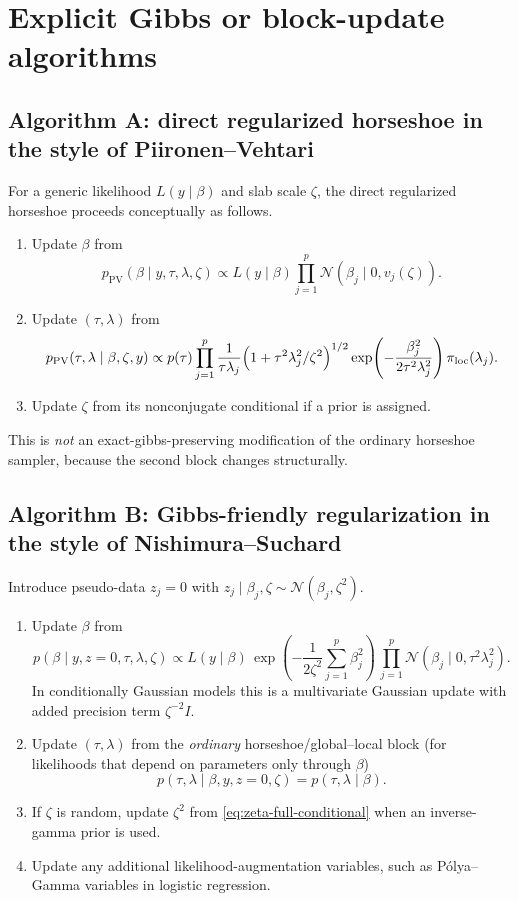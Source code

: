 \documentclass[11pt]{article}
\newcommand{\Normal}{\mathcal{N}}
\newcommand{\PV}{\mathrm{PV}}
\newcommand{\Loc}{\pi_{\mathrm{loc}}}
\begin{document}
\section{Explicit Gibbs or block-update algorithms}

\subsection{Algorithm A: direct regularized horseshoe in the style of Piironen--Vehtari}

For a generic likelihood $L(y\mid \beta)$ and slab scale $\zeta$, the direct regularized horseshoe proceeds conceptually as follows.

\begin{enumerate}
\item Update $\beta$ from
\[
p_{\PV}(\beta \mid y,\tau,\lambda,\zeta)
\propto
L(y\mid \beta)\prod_{j=1}^p \Normal(\beta_j \mid 0, v_j(\zeta)).
\]
\item Update $(\tau,\lambda)$ from
\[
p_{\PV}(\tau,\lambda \mid \beta,\zeta,y)
\propto
p(\tau)\prod_{j=1}^p
\frac{1}{\tau\lambda_j}
\Bigl(1+\tau^2\lambda_j^2/\zeta^2\Bigr)^{1/2}
\exp\!\left(-\frac{\beta_j^2}{2\tau^2\lambda_j^2}\right)\Loc(\lambda_j).
\]
\item Update $\zeta$ from its nonconjugate conditional if a prior is assigned.
\end{enumerate}

This is \emph{not} an exact-gibbs-preserving modification of the ordinary horseshoe sampler, because the second block changes structurally.

\subsection{Algorithm B: Gibbs-friendly regularization in the style of Nishimura--Suchard}

Introduce pseudo-data $z_j=0$ with $z_j \mid \beta_j,\zeta \sim \Normal(\beta_j,\zeta^2)$.

\begin{enumerate}
\item Update $\beta$ from
\[
p(\beta \mid y,z=0,\tau,\lambda,\zeta)
\propto
L(y\mid \beta)\,
\exp\!\left(-\frac{1}{2\zeta^2}\sum_{j=1}^p \beta_j^2\right)\,
\prod_{j=1}^p \Normal(\beta_j \mid 0,\tau^2\lambda_j^2).
\]
In conditionally Gaussian models this is a multivariate Gaussian update with added precision term $\zeta^{-2}I$.
\item Update $(\tau,\lambda)$ from the \emph{ordinary} horseshoe/global--local block (for likelihoods that depend on parameters only through $\beta$)
\[
p(\tau,\lambda \mid \beta,y,z=0,\zeta) = p(\tau,\lambda \mid \beta).
\]
\item If $\zeta$ is random, update $\zeta^2$ from \eqref{eq:zeta-full-conditional} when an inverse-gamma prior is used.
\item Update any additional likelihood-augmentation variables, such as P\'olya--Gamma variables in logistic regression.
\end{enumerate}
\end{document}
